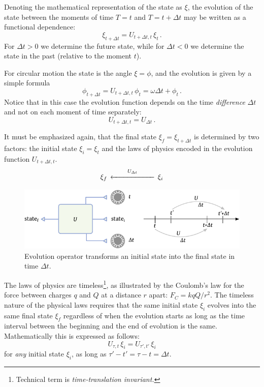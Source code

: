 Denoting the mathematical representation of the state as $\xi$, the evolution of the state between the moments of time $T=t$ and $T=t+\Delta t$ may be written as a functional dependence:
\[
\xi_{t+\Delta t} = U_{t+\Delta t, t}\,\xi_t\,.
\]
For $\Delta t > 0$ we determine the future state, while for $\Delta t < 0$ we determine the state in the past (relative to the moment $t$).
\begin{myExample}
	For circular motion the state is the angle $\xi=\phi$, and the evolution is given by a simple formula
	\[
	\phi_{t+\Delta t} = U_{t+\Delta t, t}\,\phi_t=\omega \Delta t + \phi_t\,.	
	\]
	Notice that in this case the evolution function depends on the time \emph{difference} $\Delta t$ and not on each moment of time separately:
	\[
	U_{t+\Delta t, t} = U_{\Delta t}\,.
	\]
\end{myExample}
It must be emphasized again, that the final state $\xi_f=\xi_{t+\Delta t}$ is determined by two factors: the initial state $\xi_i=\xi_t$ and the laws of physics encoded in the evolution function $U_{t+\Delta t, t}$. 
\[
\xi_f\, \overset{U_{\Delta t}}{\xleftarrow{\hspace*{2cm}}}\, \xi_i
\]

\begin{figure}[htbp]
	\centering
	\includegraphics[scale=1.0]{evolutionOperatorBox}
	\caption{Evolution operator transforms an initial state into the final state in time $\Delta t$.}
	\label{fig:evolutionOperatorBox}
\end{figure}

The laws of physics are timeless\footnote{Technical term is \emph{time-translation invariant.}}, as illustrated by the Coulomb's law for the force between charges $q$ and $Q$ at a distance $r$ apart: $F_C=k qQ/r^2$. The timeless nature of the physical laws requires that the same initial state $\xi_i$ evolves into the same final state $\xi_f$ regardless of when the evolution starts as long as the time interval between the beginning and the end of evolution is the same. Mathematically this is expressed as follows:
\[
U_{\tau, t}\,\xi_i  = U_{\tau', t'}\,\xi_i
\]
for \emph{any} initial state $\xi_i$, as long as $\tau'-t'=\tau-t=\Delta t$.

